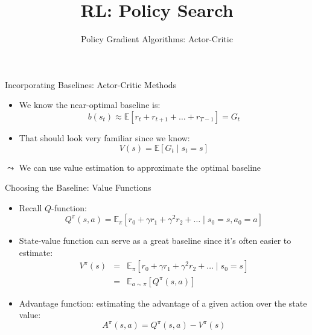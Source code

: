 \documentclass[aspectratio=169]{../latex_main/tntbeamer}  %
\title[RL: Policy Gradient]{RL: Policy Search}
\subtitle{Policy Gradient Algorithms: Actor-Critic}
\begin{document}
	
	\maketitle
\begin{frame}[c]{Incorporating Baselines: Actor-Critic Methods}

\begin{itemize}
	\item We know the near-optimal baseline is:
 $$b(s_t) \approx \mathbb{E} [r_t + r_{t+1} +\ldots + r_{T-1}] = G_t$$
    \item That should look very familiar since we know: 
    $$ V(s)  = \mathbb{E}[G_t \mid s_t=s] $$
\end{itemize}
$\leadsto$ We can use value estimation to approximate the optimal baseline
\end{frame}
\begin{frame}[c]{Choosing the Baseline: Value Functions}
	
	\begin{itemize}
		\item Recall $Q$-function:
		$$Q^\pi(s,a) = \mathbb{E}_\pi [r_0 +  \gamma r_1 + \gamma^2 r_2 + \ldots \mid s_0 = s, a_0 = a ]$$
		\item State-value function can serve as a great baseline since it's often easier to estimate:
		\begin{eqnarray}
		V^\pi (s) &=& \mathbb{E}_\pi [r_0 +  \gamma r_1 + \gamma^2 r_2 + \ldots \mid s_0 = s]\nonumber\\	
		&=& \mathbb{E}_{a\sim\pi} [Q^\pi(s,a)]\nonumber
		\end{eqnarray}
		\item Advantage function: estimating the advantage of a given action over the state value:
		$$A^\pi(s,a) = Q^\pi(s,a) - V^\pi(s) $$
	\end{itemize}
	
\end{frame}
\end{document}
